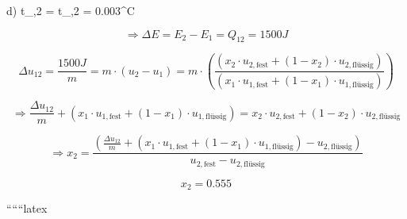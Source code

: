 d) \quad t_{,2} = t_{,2} = 0.003^\circ C

\[
\Rightarrow \Delta E = E_2 - E_1 = Q_{12} = 1500 J
\]

\[
\Delta u_{12} = \frac{1500 J}{m} = m \cdot (u_2 - u_1) = m \cdot \left( \frac{(x_2 \cdot u_{2,\text{fest}} + (1 - x_2) \cdot u_{2,\text{flüssig}})}{(x_1 \cdot u_{1,\text{fest}} + (1 - x_1) \cdot u_{1,\text{flüssig}})} \right)
\]

\[
\Rightarrow \frac{\Delta u_{12}}{m} + (x_1 \cdot u_{1,\text{fest}} + (1 - x_1) \cdot u_{1,\text{flüssig}}) = x_2 \cdot u_{2,\text{fest}} + (1 - x_2) \cdot u_{2,\text{flüssig}}
\]

\[
\Rightarrow x_2 = \frac{\left( \frac{\Delta u_{12}}{m} + (x_1 \cdot u_{1,\text{fest}} + (1 - x_1) \cdot u_{1,\text{flüssig}}) - u_{2,\text{flüssig}} \right)}{u_{2,\text{fest}} - u_{2,\text{flüssig}}}
\]

\[
x_2 = 0.555
\]

``````latex